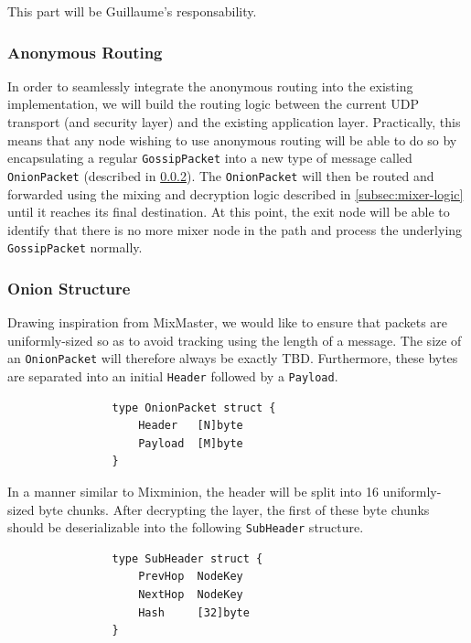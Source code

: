 \documentclass[11pt, a4paper]{article}
\begin{document}
            This part will be Guillaume's responsability.

        \subsubsection{Anonymous Routing}

            In order to seamlessly integrate the anonymous routing into the existing implementation, we will build the routing logic between the current UDP transport (and security layer) and the existing application layer.
            Practically, this means that any node wishing to use anonymous routing will be able to do so by encapsulating a regular \texttt{GossipPacket} into a new type of message called \texttt{OnionPacket} (described in \ref{subsec:onion-structure}).
            The \texttt{OnionPacket} will then be routed and forwarded using the mixing and decryption logic described in \ref{subsec:mixer-logic} until it reaches its final destination.
            At this point, the exit node will be able to identify that there is no more mixer node in the path and process the underlying \texttt{GossipPacket} normally.


        \subsubsection{Onion Structure}\label{subsec:onion-structure}

            Drawing inspiration from MixMaster, we would like to ensure that packets are uniformly-sized so as to avoid tracking using the length of a message.
            The size of an \texttt{OnionPacket} will therefore always be exactly TBD. Furthermore, these bytes are separated into an initial \texttt{Header} followed by a \texttt{Payload}.

            \begin{lstlisting}
                type OnionPacket struct {
                    Header   [N]byte
                    Payload  [M]byte
                }
            \end{lstlisting}

            In a manner similar to Mixminion, the header will be split into 16 uniformly-sized byte chunks.
            After decrypting the layer, the first of these byte chunks should be deserializable into the following \texttt{SubHeader} structure.

            \begin{lstlisting}
                type SubHeader struct {
                    PrevHop  NodeKey
                    NextHop  NodeKey
                    Hash     [32]byte
                }
            \end{lstlisting}
\end{document}
